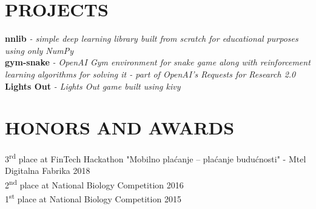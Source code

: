 \documentclass[paper=letter,fontsize=11pt]{scrartcl}
\newcommand{\sepspace}{\vspace*{1em}}		%
\newcommand{\NewPart}[2]{\section*{\uppercase{#1} \small \normalfont #2}}
\newcommand{\Language}[2]{
		\noindent \textbf{#1}
        \noindent \small \textit{#2}}
\begin{document}
\sepspace

\NewPart{Projects}{}

\Language{nnlib}{- simple deep learning library built from scratch for educational purposes using only NumPy}\\
\Language{gym-snake}{- OpenAI Gym environment for snake game along with reinforcement learning algorithms for solving it - part of OpenAI's Requests for Research 2.0}\\
\Language{Lights Out}{- Lights Out game built using kivy}\\

\sepspace

\NewPart{Honors and Awards}{}

3\textsuperscript{rd} place at FinTech Hackathon "Mobilno plaćanje – plaćanje budućnosti" - Mtel Digitalna Fabrika \hfill {2018}\\
2\textsuperscript{nd} place at National Biology Competition \hfill {2016}\\
1\textsuperscript{st} place at National Biology Competition \hfill {2015}
\end{document}

